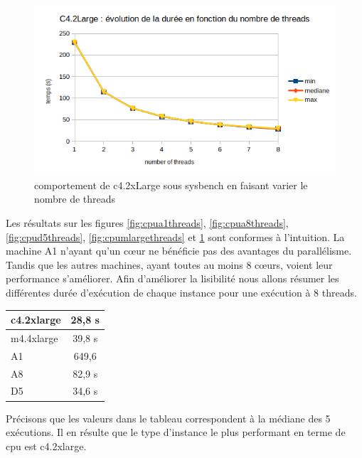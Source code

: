 \documentclass[11pt]{article}
\begin{document}
\begin{figure}
\centering
\includegraphics[width=0.9\linewidth]{images/cpuCLargeThreads}
\caption{comportement de c4.2xLarge sous sysbench en faisant varier le nombre de threads}
\label{fig:cpuclargethreads}
\end{figure}

Les résultats sur les figures \ref{fig:cpua1threads}, \ref{fig:cpua8threads}, \ref{fig:cpud5threads}, \ref{fig:cpumlargethreads} et \ref{fig:cpuclargethreads} sont conformes à l'intuition. La machine A1 n'ayant qu'un cœur ne bénéficie pas des avantages du parallélisme. Tandis que les autres machines, ayant toutes au moins 8 cœurs, voient leur performance s'améliorer. Afin d'améliorer la lisibilité nous allons résumer les différentes durée d'exécution de chaque instance pour une exécution à 8 threads. 
\begin{center}
	\begin{tabular}{|l|c|}
		\hline 
		c4.2xlarge & 28,8 s \\ 
		\hline 
		m4.4xlarge & 39,8 s \\ 
		\hline 
		A1 & 649,6 \\ 
		\hline 
		A8 & 82,9 s \\ 
		\hline 
		D5 & 34,6 s \\ 
		\hline 
	\end{tabular}
\end{center} 
Précisons que les valeurs dans le tableau correspondent à la médiane des 5 exécutions. Il en résulte que le type d'instance le plus performant en terme de cpu est c4.2xlarge.
\end{document}
